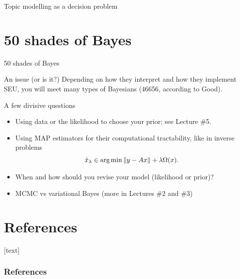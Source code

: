 \documentclass[10pt]{beamer}
\begin{document}
\begin{frame}{Topic modelling as a decision problem}
\end{frame}


\section{50 shades of Bayes}
\begin{frame}{50 shades of Bayes}
  \begin{alertblock}{An issue (or is it?)}
    Depending on how they interpret and how they implement SEU, you will meet many types of Bayesians (46656, according to Good).
  \end{alertblock}
\begin{block}{A few divisive questions}
\begin{itemize}
\item Using data or the likelihood to choose your prior; see Lecture \#5.
\item Using MAP estimators for their computational tractability, like in inverse problems
$$ \hat x_\lambda \in \operatorname*{arg\,min} \Vert y- Ax\Vert + \lambda\Omega(x).$$
\item When and how should you revise your model (likelihood or prior)?
\item MCMC vs variational Bayes (more in Lectures \#2 and \#3)
\end{itemize}
\end{block}
\end{frame}

\section*{References}
[text]%
\begin{frame}[allowframebreaks]
\frametitle{References}
\small
\printbibliography
\normalsize
\end{frame}
\end{document}
